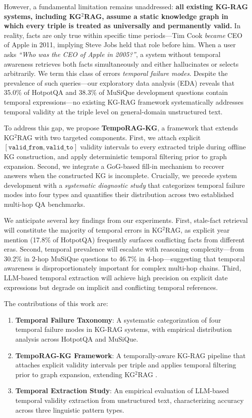 \documentclass[11pt]{article}
\begin{document}
However, a fundamental limitation remains unaddressed: \textbf{all existing
KG-RAG systems, including KG$^2$RAG, assume a static knowledge graph in
which every triple is treated as universally and permanently valid.} In
reality, facts are only true within specific time periods---Tim Cook
\textit{became} CEO of Apple in 2011, implying Steve Jobs held that role
before him. When a user asks \textit{``Who was the CEO of Apple in 2005?''},
a system without temporal awareness retrieves both facts simultaneously and
either hallucinates or selects arbitrarily. We term this class of errors
\textit{temporal failure modes}. Despite the prevalence of such queries---our
exploratory data analysis (EDA) reveals that 35.0\% of HotpotQA and 38.3\%
of MuSiQue development questions contain temporal expressions---no existing
KG-RAG framework systematically addresses temporal validity at the
triple level on general-domain unstructured text.

To address this gap, we propose \textbf{TempoRAG-KG}, a framework that
extends KG$^2$RAG with two targeted components. First, we attach explicit
$[\mathtt{valid\_from}, \mathtt{valid\_to}]$ validity intervals to every
extracted triple during offline KG construction, and apply deterministic
temporal filtering prior to graph expansion. Second, we integrate a
GoG-based fill-in mechanism \cite{he2024gog} to recover answers when the
constructed KG is incomplete. Crucially, we precede system development
with a \textit{systematic diagnostic study} that categorizes temporal
failure modes into four types and quantifies their distribution across
two established multi-hop QA benchmarks.

We anticipate several key findings from our experiments. First, stale-fact
retrieval will constitute the majority of temporal errors in KG$^2$RAG,
as explicit year mention (17.8\% of HotpotQA) frequently surfaces
conflicting facts from different eras. Second, temporal prevalence will
escalate with reasoning complexity---from 30.2\% in 2-hop MuSiQue questions
to 46.7\% in 4-hop---suggesting that temporal awareness is disproportionately
important for complex multi-hop chains. Third, LLM-based temporal extraction
will achieve high precision on explicit date expressions but degrade on
implicit and conflicting temporal references.

The contributions of this work are:
\begin{enumerate}
  \item \textbf{Temporal Failure Taxonomy}: A systematic categorization of
        four temporal failure modes in KG-RAG systems, with empirical
        distribution analysis across HotpotQA and MuSiQue.
  \item \textbf{TempoRAG-KG Framework}: A temporally-aware KG-RAG pipeline
        that attaches explicit validity intervals per triple and applies
        temporal filtering prior to graph expansion, extending
        KG$^2$RAG \cite{zhu2025kg2rag}.
  \item \textbf{Temporal Extraction Study}: An empirical evaluation of
        LLM-based temporal validity extraction from unstructured text,
        characterizing accuracy across three linguistic pattern types.
\end{enumerate}
\end{document}
